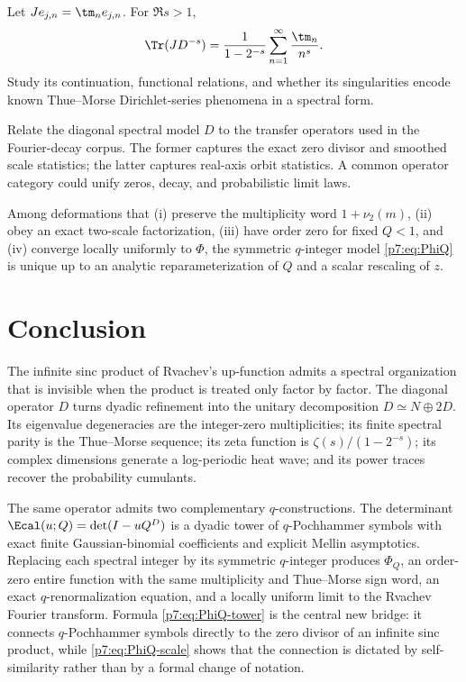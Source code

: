 \documentclass[11pt]{article}
\numberwithin{equation}{section}
\theoremstyle{definition}
\theoremstyle{remark}
\begin{document}
\begin{problem}
Let $J e_{j,n}=\tm_n e_{j,n}$.  For $\Re s>1$,
\begin{equation}\label{p7:eq:twisted-zeta}
 \Tr(JD^{-s})
 =\frac{1}{1-2^{-s}}
 \sum_{n=1}^{\infty}\frac{\tm_n}{n^s}.
\end{equation}
Study its continuation, functional relations, and whether its singularities encode known Thue--Morse Dirichlet-series phenomena in a spectral form.
\end{problem}

\begin{problem}
Relate the diagonal spectral model $D$ to the transfer operators used in the Fourier-decay corpus.  The former captures the exact zero divisor and smoothed scale statistics; the latter captures real-axis orbit statistics.  A common operator category could unify zeros, decay, and probabilistic limit laws.
\end{problem}

\begin{conjecture}
Among deformations that (i) preserve the multiplicity word $1+\nu_2(m)$, (ii) obey an exact two-scale factorization, (iii) have order zero for fixed $Q<1$, and (iv) converge locally uniformly to $\Phi$, the symmetric $q$-integer model \cref{p7:eq:PhiQ} is unique up to an analytic reparameterization of $Q$ and a scalar rescaling of $z$.
\end{conjecture}

\section{Conclusion}

The infinite sinc product of Rvachev's up-function admits a spectral organization that is invisible when the product is treated only factor by factor.  The diagonal operator $D$ turns dyadic refinement into the unitary decomposition $D\simeq N\oplus2D$.  Its eigenvalue degeneracies are the integer-zero multiplicities; its finite spectral parity is the Thue--Morse sequence; its zeta function is $\zeta(s)/(1-2^{-s})$; its complex dimensions generate a log-periodic heat wave; and its power traces recover the probability cumulants.

The same operator admits two complementary $q$-constructions.  The determinant $\Ecal(u;Q)=\det(I-uQ^D)$ is a dyadic tower of $q$-Pochhammer symbols with exact finite Gaussian-binomial coefficients and explicit Mellin asymptotics.  Replacing each spectral integer by its symmetric $q$-integer produces $\Phi_Q$, an order-zero entire function with the same multiplicity and Thue--Morse sign word, an exact $q$-renormalization equation, and a locally uniform limit to the Rvachev Fourier transform.  Formula \cref{p7:eq:PhiQ-tower} is the central new bridge: it connects $q$-Pochhammer symbols directly to the zero divisor of an infinite sinc product, while \cref{p7:eq:PhiQ-scale} shows that the connection is dictated by self-similarity rather than by a formal change of notation.
\end{document}
